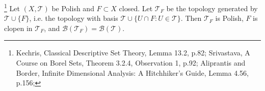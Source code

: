 \begin{lemma} \label{L:clos_clopen}
  \footnote{Kechris, Classical Descriptive Set Theory, Lemma 13.2, p.82;
    Srivastava, A Course on Borel Sets, Theorem 3.2.4, Observation 1, p.92;
    Aliprantis and Border, Infinite Dimensional Analysis: A Hitchhiker's 
    Guide, Lemma 4.56, p.156;
  }
  Let $(X,\mathcal{T})$ be Polish and $F\subset X$ closed. Let $\mathcal{T}_F$
  be the topology generated by $\mathcal{T}\cup\{F\}$, i.e. the topology with
  basis $\mathcal{T}\cup\{U\cap F:U\in\mathcal{T}\}$. Then $\mathcal{T}_F$ is
  Polish, $F$ is clopen in $\mathcal{T}_F$, and 
  $\mathcal{B}(\mathcal{T}_F)=\mathcal{B}(\mathcal{T})$.
\end{lemma}
